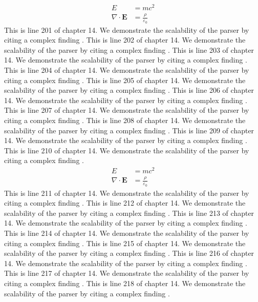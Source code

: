 \begin{align*}
  E &= mc^2 \\
  \nabla \cdot \mathbf{E} &= \frac{\rho}{\varepsilon_0}
\end{align*}
This is line 201 of chapter 14. We demonstrate the scalability of the parser by citing a complex finding \cite{ref14_201}.
This is line 202 of chapter 14. We demonstrate the scalability of the parser by citing a complex finding \cite{ref14_202}.
This is line 203 of chapter 14. We demonstrate the scalability of the parser by citing a complex finding \cite{ref14_203}.
This is line 204 of chapter 14. We demonstrate the scalability of the parser by citing a complex finding \cite{ref14_204}.
This is line 205 of chapter 14. We demonstrate the scalability of the parser by citing a complex finding \cite{ref14_205}.
This is line 206 of chapter 14. We demonstrate the scalability of the parser by citing a complex finding \cite{ref14_206}.
This is line 207 of chapter 14. We demonstrate the scalability of the parser by citing a complex finding \cite{ref14_207}.
This is line 208 of chapter 14. We demonstrate the scalability of the parser by citing a complex finding \cite{ref14_208}.
This is line 209 of chapter 14. We demonstrate the scalability of the parser by citing a complex finding \cite{ref14_209}.
This is line 210 of chapter 14. We demonstrate the scalability of the parser by citing a complex finding \cite{ref14_210}.
\begin{align*}
  E &= mc^2 \\
  \nabla \cdot \mathbf{E} &= \frac{\rho}{\varepsilon_0}
\end{align*}
This is line 211 of chapter 14. We demonstrate the scalability of the parser by citing a complex finding \cite{ref14_211}.
This is line 212 of chapter 14. We demonstrate the scalability of the parser by citing a complex finding \cite{ref14_212}.
This is line 213 of chapter 14. We demonstrate the scalability of the parser by citing a complex finding \cite{ref14_213}.
This is line 214 of chapter 14. We demonstrate the scalability of the parser by citing a complex finding \cite{ref14_214}.
This is line 215 of chapter 14. We demonstrate the scalability of the parser by citing a complex finding \cite{ref14_215}.
This is line 216 of chapter 14. We demonstrate the scalability of the parser by citing a complex finding \cite{ref14_216}.
This is line 217 of chapter 14. We demonstrate the scalability of the parser by citing a complex finding \cite{ref14_217}.
This is line 218 of chapter 14. We demonstrate the scalability of the parser by citing a complex finding \cite{ref14_218}.
